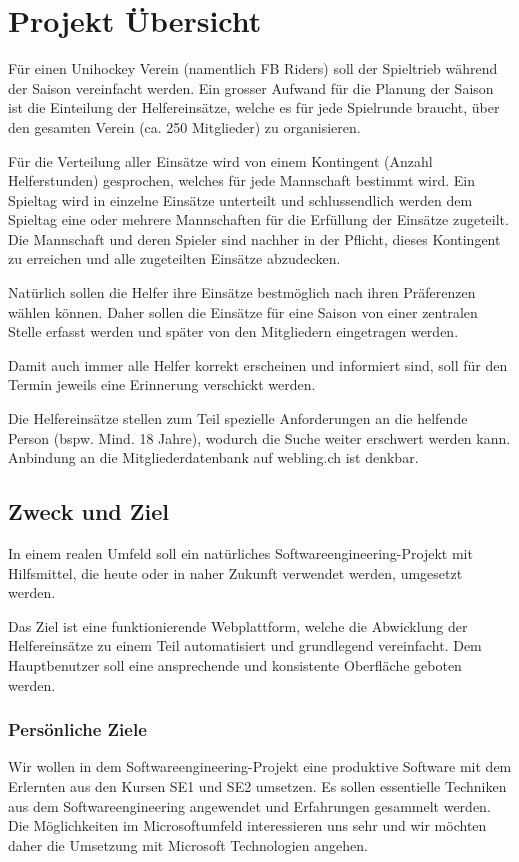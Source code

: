 \chapter{Projekt Übersicht}
Für einen Unihockey Verein (namentlich FB Riders) soll der Spieltrieb während der Saison vereinfacht werden. Ein grosser Aufwand für die Planung der Saison ist die Einteilung der Helfereinsätze, welche es für jede Spielrunde braucht, über den gesamten Verein (ca. 250 Mitglieder) zu organisieren.

Für die Verteilung aller Einsätze wird von einem Kontingent (Anzahl Helferstunden) gesprochen, welches für jede Mannschaft bestimmt wird. Ein Spieltag wird in einzelne Einsätze unterteilt und schlussendlich werden dem Spieltag eine oder mehrere Mannschaften für die Erfüllung der Einsätze zugeteilt. Die Mannschaft und deren Spieler sind nachher in der Pflicht, dieses Kontingent zu erreichen und alle zugeteilten Einsätze abzudecken.

Natürlich sollen die Helfer ihre Einsätze bestmöglich nach ihren Präferenzen wählen können. Daher sollen die Einsätze für eine Saison von einer zentralen Stelle erfasst werden und später von den Mitgliedern eingetragen werden.

Damit auch immer alle Helfer korrekt erscheinen und informiert sind, soll für den Termin jeweils eine Erinnerung verschickt werden.

Die Helfereinsätze stellen zum Teil spezielle Anforderungen an die helfende Person (bspw. Mind. 18 Jahre), wodurch die Suche weiter erschwert werden kann. 
Anbindung an die Mitgliederdatenbank auf webling.ch ist denkbar. 

\section{Zweck und Ziel}
In einem realen Umfeld soll ein natürliches Softwareengineering-Projekt mit Hilfsmittel, die heute oder in naher Zukunft verwendet werden, umgesetzt werden. 

Das Ziel ist eine funktionierende Webplattform, welche die Abwicklung der Helfereinsätze zu einem Teil automatisiert und grundlegend vereinfacht. Dem Hauptbenutzer soll eine ansprechende und konsistente Oberfläche geboten werden.

\subsection{Persönliche Ziele}
Wir wollen in dem Softwareengineering-Projekt eine produktive Software mit dem Erlernten aus den Kursen SE1 und SE2 umsetzen. Es sollen essentielle Techniken aus dem Softwareengineering angewendet und Erfahrungen gesammelt werden. Die Möglichkeiten im Microsoftumfeld interessieren uns sehr und wir möchten daher die Umsetzung mit Microsoft Technologien angehen.

